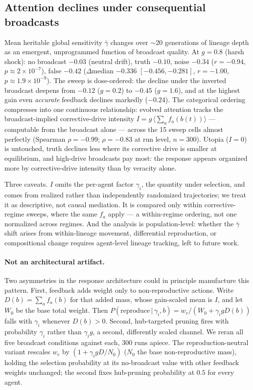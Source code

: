 \documentclass{svproc}
\begin{document}
\subsection{Attention declines under consequential broadcasts}
Mean heritable global sensitivity $\bar\gamma$ changes over $\sim$20
generations of lineage depth as an emergent, unprogrammed function of
broadcast quality. At $g=0.8$ (harsh shock): no
broadcast $-0.03$ (neutral drift), truth $-0.10$, noise $-0.34$ ($r=-0.94$,
$p\!\approx\!2\times10^{-7}$), false $-0.42$ ($\Delta$median $-0.336$
$[-0.456,-0.281]$, $r=-1.00$, $p\!\approx\!1.9\times10^{-9}$). The sweep is
dose-ordered: the decline under the inverted broadcast deepens from $-0.12$
($g=0.2$) to $-0.45$ ($g=1.6$), and at the highest gain even \emph{accurate}
feedback declines markedly ($-0.24$). The categorical ordering compresses into one
continuous relationship: evolved attention tracks the broadcast-implied
corrective-drive intensity $I = g\,\langle\textstyle\sum_a f_a(b(t))\rangle$
--- computable from the broadcast alone --- across the 15 sweep cells almost
perfectly (Spearman $\rho=-0.99$; $\rho=-0.83$ at run level, $n=300$). Utopia ($I=0$) is untouched, truth declines less where its corrective drive is
smaller at equilibrium, and high-drive broadcasts pay most: the response appears organized more by
corrective-drive intensity than by veracity alone.

Three caveats. $I$ omits the per-agent factor $\gamma_i$, the quantity under
selection, and comes from realized rather than independently randomized
trajectories; we treat it as descriptive, not causal mediation. It is
compared only within corrective-regime sweeps, where the same $f_a$ apply ---
a within-regime ordering, not one normalized across regimes. And the analysis is
population-level: whether the $\bar\gamma$ shift arises from within-lineage
movement, differential reproduction, or compositional change requires
agent-level lineage tracking, left to future work.

\paragraph{Not an architectural artifact.} Two asymmetries in the response
architecture could in principle manufacture this pattern. First, feedback
adds weight only to non-reproductive actions. Write $D(b)=\sum_a f_a(b)$ for
that added mass, whose gain-scaled mean is $I$, and let $W_0$ be the base
total weight. Then
$P(\text{reproduce}\,|\,\gamma_i,b)=w_r/(W_0+\gamma_i g D(b))$ falls with
$\gamma_i$ whenever $D(b)>0$.
Second, hub-targeted pruning fires with probability $\gamma_i$ rather than
$\gamma_i g$, a second, differently scaled channel. We reran all five
broadcast conditions against each, 300 runs apiece. The reproduction-neutral
variant rescales $w_r$ by $(1+\gamma_i g D/N_0)$ ($N_0$ the base
non-reproductive mass), holding the selection probability at its no-broadcast
value with other feedback weights unchanged; the second fixes hub-pruning
probability at $0.5$ for every agent.
\end{document}
